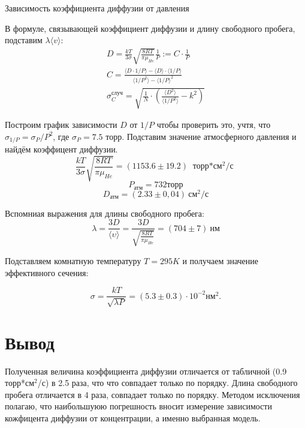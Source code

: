 \documentclass[11pt,a4paper]{article}
\begin{document}
\begin{enumerate}
\begin{table}[h!]
\begin{center}
    \caption{Зависимость коэффициента диффузии от давления}
    \label{data}
    \end{center}
\end{table}




В формуле, связывающей коэффициент диффузии и
длину свободного пробега, подставим $\lambda\langle v \rangle$:
\begin{gather}
  D = \frac{kT}{3\sigma} \sqrt{\frac{8RT}{\pi \mu_{He}}} \frac{1}{P} := C \cdot \frac{1}{P} \\
  C = \frac{\langle D \cdot 1/P \rangle - \langle D \rangle \cdot \langle 1/P \rangle }{\langle 1/P^2 \rangle - {\langle 1/P \rangle} ^ 2} \\
  \sigma_C^{\text{случ}} = \sqrt{\frac{1}{N} \cdot \left(\frac{ \langle {D}^2 \rangle}{\langle 1/P^2 \rangle} - k^2 \right)}
\end{gather}

Построим график зависимости $D$ от $1/P$ чтобы проверить это, учтя, что $\sigma_{1/P} = \sigma_P / P^2$, где $\sigma_P = 7.5$ торр. Подставим значение атмосферного давления и найдём коэффицент диффузии.
\[\frac{kT}{3\sigma} \sqrt{\frac{8RT}{\pi \mu_{He}}} = (1153.6 \pm 19.2) \ \text{ торр*см$^2$/с }\]
\[P_{\text{атм}} = 732 \text{торр}\]\[  D_{\text{атм}} = (2.33 \pm 0,04) \  \text{см$^2$/с}\]

Вспомниая выражения для длины свободного пробега:
\[\lambda = \frac{3D}{\langle \upsilon \rangle} = \frac{3D}{\sqrt{\frac{8RT}{\pi \mu_{He}}}} = (704 \pm 7) \ \text{нм}\]


Подставляем комнатную температуру $T = 295K$ и получаем значение эффективного сечения:

\begin{equation}
    \sigma = \frac{kT}{\sqrt{\lambda P}} = (5.3 \pm 0.3) \cdot 10^{-2} \text{нм$^2$}.
\end{equation}
\end{enumerate}

\section*{Вывод}
Полученная величина коэффициента диффузии отличается от табличной (0.9 торр*см$^2$/с) в 2.5 раза, что
что совпадает только по порядку. Длина свободного пробега отличается в 4 раза, совпадает только по порядку.
Методом исключения полагаю, что наибольшуюю погрешность вносит измерение зависимости кожфицента диффузии от концентрации,
а именно выбранная модель.
\end{document}
